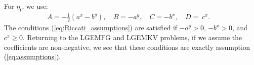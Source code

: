 \documentclass[11pt]{article}
\begin{document}
\begin{appendices}
For $\eta_t$, we use:
\begin{equation*}
	\begin{array}{rl}
		A=-\frac{1}{2}(a^x-b^y), \quad B=-a^y, \quad C=-b^x, \quad D=\ c^x.
	\end{array}
\end{equation*}
The conditions (\ref{eq:Riccati_assumptions}) are satisfied if $-a^y>0$, $-b^x>0$, and $c^x \geq0$. Returning to the LGEMFG and LGEMKV problems, if we assume the coefficients are non-negative, we see that these conditions are exactly assumption (\ref{eq:assumptions}).

\end{appendices}
\end{document}
